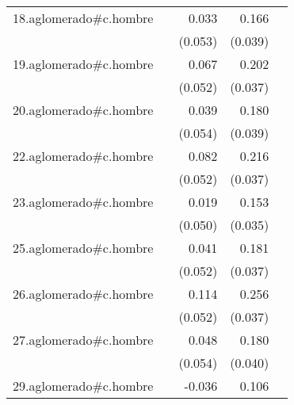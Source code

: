{\begin{longtable}{l*{4}{D{.}{.}{-1}}}
\addlinespace
18.aglomerado#c.hombre&                     &       0.033         &       0.166\sym{***}&                     \\
            &                     &     (0.053)         &     (0.039)         &                     \\
\addlinespace
19.aglomerado#c.hombre&                     &       0.067         &       0.202\sym{***}&                     \\
            &                     &     (0.052)         &     (0.037)         &                     \\
\addlinespace
20.aglomerado#c.hombre&                     &       0.039         &       0.180\sym{***}&                     \\
            &                     &     (0.054)         &     (0.039)         &                     \\
\addlinespace
22.aglomerado#c.hombre&                     &       0.082         &       0.216\sym{***}&                     \\
            &                     &     (0.052)         &     (0.037)         &                     \\
\addlinespace
23.aglomerado#c.hombre&                     &       0.019         &       0.153\sym{***}&                     \\
            &                     &     (0.050)         &     (0.035)         &                     \\
\addlinespace
25.aglomerado#c.hombre&                     &       0.041         &       0.181\sym{***}&                     \\
            &                     &     (0.052)         &     (0.037)         &                     \\
\addlinespace
26.aglomerado#c.hombre&                     &       0.114\sym{*}  &       0.256\sym{***}&                     \\
            &                     &     (0.052)         &     (0.037)         &                     \\
\addlinespace
27.aglomerado#c.hombre&                     &       0.048         &       0.180\sym{***}&                     \\
            &                     &     (0.054)         &     (0.040)         &                     \\
\addlinespace
29.aglomerado#c.hombre&                     &      -0.036         &       0.106\sym{**} &                     \\

\end{longtable}}
